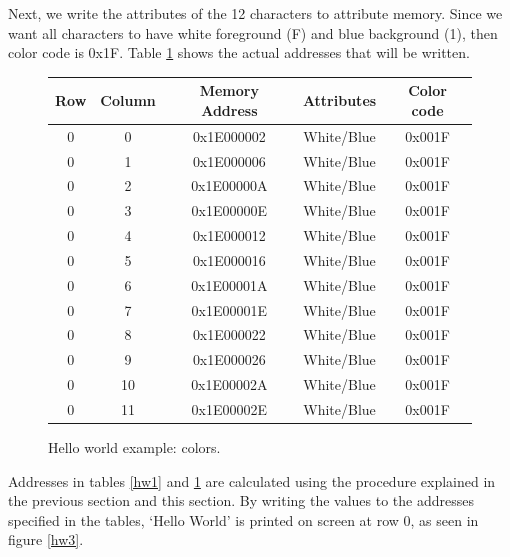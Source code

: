 \documentclass[oneside]{book}
\begin{document}
Next, we write the attributes of the 12 characters to attribute memory.
Since we want all characters to have white foreground (F) and blue
background (1), then color code is 0x1F. Table \ref{hw2} shows
the actual addresses that will be written.

\begin{figure}[H]
\begin{center}
\begin{tabular}{|c|c|c|c|c|}

\hline \textbf{Row} & \textbf{Column} &
       \textbf{Memory Address} & \textbf{Attributes} & \textbf{Color code}  \\

\hline 0 & 0  & 0x1E000002 & White/Blue & 0x001F \\
\hline 0 & 1  & 0x1E000006 & White/Blue & 0x001F \\
\hline 0 & 2  & 0x1E00000A & White/Blue & 0x001F \\
\hline 0 & 3  & 0x1E00000E & White/Blue & 0x001F \\
\hline 0 & 4  & 0x1E000012 & White/Blue & 0x001F \\
\hline 0 & 5  & 0x1E000016 & White/Blue & 0x001F \\
\hline 0 & 6  & 0x1E00001A & White/Blue & 0x001F \\
\hline 0 & 7  & 0x1E00001E & White/Blue & 0x001F \\
\hline 0 & 8  & 0x1E000022 & White/Blue & 0x001F \\
\hline 0 & 9  & 0x1E000026 & White/Blue & 0x001F \\
\hline 0 & 10 & 0x1E00002A & White/Blue & 0x001F \\
\hline 0 & 11 & 0x1E00002E & White/Blue & 0x001F \\

\hline

\end{tabular}
\end{center}
\caption{Hello world example: colors.}
\label{hw2}
\end{figure}

Addresses in tables \ref{hw1} and \ref{hw2} are calculated using the
procedure explained in the previous section and this section. By writing
the values to the addresses specified in the tables, `Hello World' is
printed on screen at row 0, as seen in figure \ref{hw3}.
\end{document}
